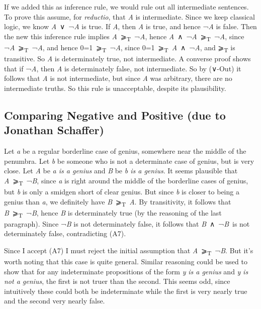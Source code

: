 \documentclass[
  10pt,
  letterpaper,
  DIV=11,
  numbers=noendperiod,
  twoside]{scrartcl}
\begin{document}
If we added this as inference rule, we would rule out all intermediate
sentences. To prove this assume, for \emph{reductio}, that \emph{A} is
intermediate. Since we keep classical logic, we know
\emph{A}~∨~¬\emph{A} is true. If \emph{A}, then \emph{A} is true, and
hence ¬\emph{A} is false. Then the new this inference rule implies
\emph{A}~⩾\textsubscript{T}~¬\emph{A}, hence
\emph{A}~∧~¬\emph{A}~⩾\textsubscript{T}~¬\emph{A}, since
¬\emph{A}~⩾\textsubscript{T}~¬\emph{A}, and hence
0=1~⩾\textsubscript{T}~¬\emph{A}, since
0=1~⩾\textsubscript{T}~\emph{A}~∧~¬\emph{A}, and ⩾\textsubscript{T} is
transitive. So \emph{A} is determinately true, not intermediate. A
converse proof shows that if ¬\emph{A}, then \emph{A} is determinately
false, not intermediate. So by (∨-Out) it follows that \emph{A} is not
intermediate, but since \emph{A} was arbitrary, there are no
intermediate truths. So this rule is unacceptable, despite its
plausibility.

\subsection*{Comparing Negative and Positive (due to Jonathan
Schaffer)}\label{comparing-negative-and-positive-due-to-jonathan-schaffer}

Let \emph{a} be a regular borderline case of genius, somewhere near the
middle of the penumbra. Let \emph{b} be someone who is not a determinate
case of genius, but is very close. Let \emph{A} be \emph{a is a genius}
and \emph{B} be \emph{b is a genius}. It seems plausible that
\emph{A}~⩾\textsubscript{T}~¬\emph{B}, since \emph{a} is right around
the middle of the borderline cases of genius, but \emph{b} is only a
smidgen short of clear genius. But since \emph{b} is closer to being a
genius than \emph{a}, we definitely have
\emph{B}~⩾\textsubscript{T}~\emph{A}. By transitivity, it follows that
\emph{B}~⩾\textsubscript{T}~¬\emph{B}, hence \emph{B} is determinately
true (by the reasoning of the last paragraph). Since ¬\emph{B} is not
determinately false, it follows that \emph{B}~∧~¬\emph{B}~is not
determinately false, contradicting (A7).

Since I accept (A7) I must reject the initial assumption that
\emph{A}~⩾\textsubscript{T}~¬\emph{B}. But it's worth noting that this
case is quite general. Similar reasoning could be used to show that for
any indeterminate propositions of the form \emph{y} \emph{is a genius}
and \emph{y} \emph{is not a genius}, the first is not truer than the
second. This seems odd, since intuitively these could both be
indeterminate while the first is very nearly true and the second very
nearly false.
\end{document}
